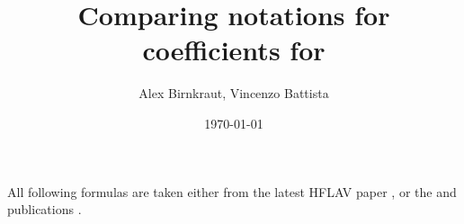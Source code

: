 \documentclass[a4paper, 12pt]{scrartcl}
\title{Comparing notations for \CP coefficients for \BdToDpi}
\date{\today}
\author{Alex Birnkraut, Vincenzo Battista}
\numberwithin{equation}{section}
\begin{document}
\maketitle

All following formulas are taken either from the latest HFLAV paper \cite{Amhis:2016xyh}, or
the \belle and \babar publications \cite{Ronga:2006hv, Aubert:2006tw}.

\newpage

\newpage


\printbibliography
\end{document}
